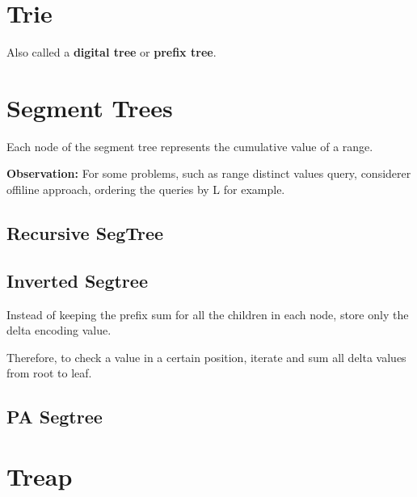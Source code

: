
\section{Trie}

    Also called a \textbf{digital tree} or \textbf{prefix tree}.
    

\section{Segment Trees}

    Each node of the segment tree represents the cumulative value of a range.

    \textbf{Observation:} For some problems, such as range distinct values query,
    considerer offiline approach, ordering the queries by L for example. 

    \subsection{Recursive SegTree}



    \subsection{Inverted Segtree}

        Instead of keeping the prefix sum for all the children in each node, store only the delta encoding value.

        Therefore, to check a value in a certain position, iterate and sum all delta values from root to leaf.


    \subsection{PA Segtree}


\section{Treap}

